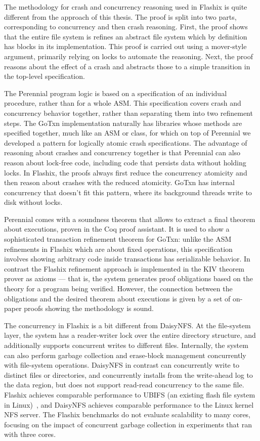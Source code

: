 The methodology for crash and concurrency reasoning used in Flashix is quite
different from the approach of this thesis. The proof is split into two parts,
corresponding to concurrency and then crash reasoning. First, the proof shows
that the entire file system is refines an abstract file system which by
definition has  blocks in its implementation. This proof is carried
out using a mover-style argument, primarily relying on locks to automate the
reasoning. Next, the proof reasons about the effect of a crash and abstracts
those to a simple transition in the top-level specification.

The Perennial program logic is based on a specification of an individual
procedure, rather than for a whole ASM. This specification covers crash and
concurrency behavior together, rather than separating them into two refinement
steps. The GoTxn implementation naturally has libraries whose methods are
specified together, much like an ASM or class, for which on top of Perennial we
developed a pattern for logically atomic crash specifications. The advantage of
reasoning about crashes and concurrency together is that Perennial can also
reason about lock-free code, including code that persists data without holding
locks. In Flashix, the proofs always first reduce the concurrency atomicity and
then reason about crashes with the reduced atomicity. GoTxn has internal
concurrency that doesn't fit this pattern, where its background threads write to
disk without locks.

Perennial comes with a soundness theorem that allows to extract a final theorem
about executions, proven in the Coq proof assistant. It is used to show a
sophisticated transaction refinement theorem for GoTxn: unlike the ASM
refinements in Flashix which are about fixed operations, this specification
involves showing arbitrary code inside transactions has serializable behavior.
In contrast the Flashix refinement approach is implemented in the KIV theorem
prover as axioms --- that is, the system generates proof obligations based on
the theory for a program being verified. However, the connection between the
obligations and the desired theorem about executions is given by a set of
on-paper proofs showing the methodology is sound.

The concurrency in Flashix is a bit different from DaisyNFS. At the file-system
layer, the system has a reader-writer lock over the entire directory structure,
and additionally supports concurrent writes to different files. Internally, the
system can also perform garbage collection and erase-block management
concurrently with file-system operations. DaisyNFS in contrast can concurrently
write to distinct files or directories, and concurrently installs from the
write-ahead log to the data region, but does not support read-read concurrency
to the same file. Flashix achieves comparable performance to UBIFS (an
existing flash file system in Linux)~\cite{bodenmuller:concurrent-flashix}, and
DaisyNFS achieves comparable performance to the Linux kernel NFS server.
The Flashix benchmarks do not evaluate scalability to many cores, focusing on
the impact of concurrent garbage collection in experiments that ran with three
cores.

